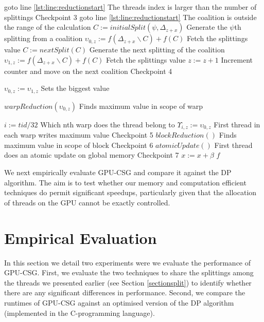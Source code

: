 \documentclass{llncs}
\begin{document}
\begin{algorithm}[!t]
\begin{algorithmic}[1]
  \IF{$\psi \geq \Psi$}
    \STATE goto line \ref{lst:line:reductionstart} \hfill The threads index is larger than the number of splittings
  \ENDIF
\hfill Checkpoint 3
    \label{lst:line:gotoif}
      \STATE goto line \ref{lst:line:reductionstart} \hfill The coalition is outside the range of the calculation
    \ENDIF
    \STATE $C := initialSplit(\psi,\Delta_{z+x})$ \hfill Generate the $\psi$th splitting from a coalition 
    \STATE $\upsilon_{0,z} := f(\Delta_{z+x}\backslash C)+f(C)$ \hfill Fetch the splittings value
    \STATE $C := nextSplit(C)$ \hfill Generate the next splitting of the coalition
    \STATE $\upsilon_{1,z} := f(\Delta_{z+x}\backslash C)+f(C)$ \hfill Fetch the splittings value
    \STATE $z := z + 1$ \hfill Increment counter and move on the next coalition
  \ENDFOR
\hfill Checkpoint 4
  \label{lst:line:reductionstart}
  
    \label{lst:line:checkif}
      \STATE $\upsilon_{0,z} := \upsilon_{1,z}$ \hfill Sets the biggest value
    \ENDIF
    
    \STATE $warpReduction(\upsilon_{0,z})$ \hfill Finds maximum value in scope of warp

      \STATE $i := tid / 32$ \hfill Which nth warp does the thread belong to
      \STATE $\Upsilon_{i,z} := \upsilon_{0,z}$ \hfill First thread in each warp writes maximum value
    \ENDIF
  \ENDFOR   \hfill Checkpoint 5
  \STATE $blockReduction()$\label{lst:line:blockReduction} \hfill Finds maximum value in scope of block
  \hfill Checkpoint 6
  \STATE $atomicUpdate()$\label{lst:line:reductionend} \hfill First thread does an atomic update on global memory
  \ENDIF  \hfill Checkpoint 7
  \STATE $x := x + \beta$
\ENDFOR
\RETURN $f$
\end{algorithmic}
\end{algorithm}

We next empirically evaluate GPU-CSG and compare it against the DP algorithm. The aim is to test whether our memory and computation efficient techniques do permit significant speedups, particularly given that the allocation of threads on the GPU cannot be exactly controlled.

\section{Empirical Evaluation}
In this section we detail two experiments were we evaluate the performance of GPU-CSG. First, we evaluate the two techniques to share the splittings among the threads we presented earlier (see Section \ref{sectionsplit}) to identify whether there are any significant differences in performance. Second, we compare the runtimes of GPU-CSG against an optimised version of the DP algorithm (implemented in the C-programming language).
\end{document}
